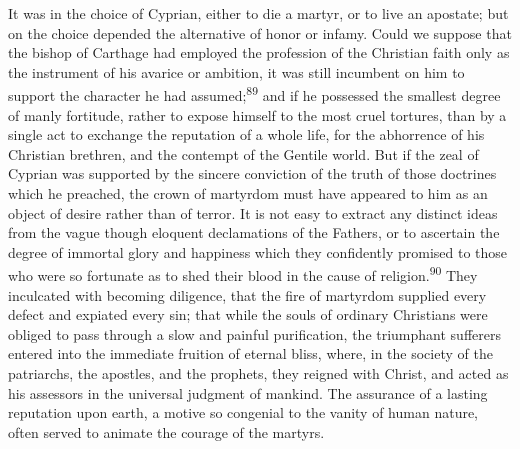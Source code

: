 
It was in the choice of Cyprian, either to die a martyr, or to
live an apostate; but on the choice depended the alternative of
honor or infamy. Could we suppose that the bishop of Carthage had
employed the profession of the Christian faith only as the
instrument of his avarice or ambition, it was still incumbent on
him to support the character he had assumed;\textsuperscript{89} and if he
possessed the smallest degree of manly fortitude, rather to
expose himself to the most cruel tortures, than by a single act
to exchange the reputation of a whole life, for the abhorrence of
his Christian brethren, and the contempt of the Gentile world.
But if the zeal of Cyprian was supported by the sincere
conviction of the truth of those doctrines which he preached, the
crown of martyrdom must have appeared to him as an object of
desire rather than of terror. It is not easy to extract any
distinct ideas from the vague though eloquent declamations of the
Fathers, or to ascertain the degree of immortal glory and
happiness which they confidently promised to those who were so
fortunate as to shed their blood in the cause of religion.\textsuperscript{90}
They inculcated with becoming diligence, that the fire of
martyrdom supplied every defect and expiated every sin; that
while the souls of ordinary Christians were obliged to pass
through a slow and painful purification, the triumphant sufferers
entered into the immediate fruition of eternal bliss, where, in
the society of the patriarchs, the apostles, and the prophets,
they reigned with Christ, and acted as his assessors in the
universal judgment of mankind. The assurance of a lasting
reputation upon earth, a motive so congenial to the vanity of
human nature, often served to animate the courage of the martyrs.

